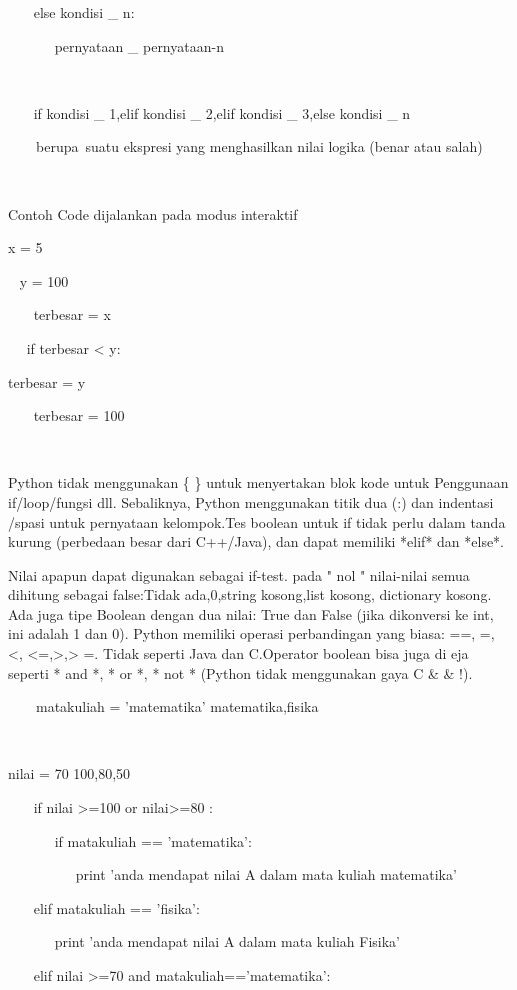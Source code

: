  
~~~ else kondisi   \_  n: 

 
~~~~~~ pernyataan   \_  pernyataan-n 

 
~~~~~~  
 
~~~ if kondisi   \_  1,elif kondisi   \_  2,elif kondisi   \_  3,else kondisi   \_  n 

 
~~~~berupa~suatu ekspresi yang menghasilkan nilai logika (benar atau salah)    
 
~~~  
 
Contoh Code dijalankan pada modus interaktif 

 
  x = 5 

 
~ y = 100 

 
~~~ terbesar = x 

 
~~ if terbesar < y: 

 
terbesar = y 

~~~ terbesar = 100  

 
~~~  

 
   Python tidak menggunakan    \{     \}   untuk menyertakan blok kode untuk Penggunaan if/loop/fungsi dll. Sebaliknya, Python menggunakan titik dua (:) dan indentasi /spasi untuk pernyataan   kelompok.Tes   boolean untuk if tidak perlu dalam tanda kurung (perbedaan besar dari C++/Java), dan dapat memiliki *elif* dan *else*. 
 

            Nilai apapun dapat digunakan sebagai if-test. pada   " nol  "  nilai-nilai semua dihitung sebagai false:Tidak ada,0,string kosong,list kosong, dictionary kosong. Ada juga tipe Boolean dengan dua nilai: True dan False (jika dikonversi ke int, ini adalah 1 dan 0). Python memiliki operasi perbandingan yang biasa: ==, =, <, <=,>,> =. Tidak seperti Java dan C.Operator boolean bisa juga di eja seperti * and *, * or *, * not * (Python tidak menggunakan gaya C    \&      \&      \vert      \vert  !). 

 
~~~~matakuliah = 'matematika'   matematika,fisika 
 
~~  
 
 nilai = 70 100,80,50 

 
~~~ if nilai >=100 or nilai>=80 : 

 
~~~~~~ if matakuliah == 'matematika': 

 
~~~~~~~~~ print 'anda mendapat nilai A dalam mata kuliah matematika' 

 
~~~ elif matakuliah == 'fisika': 

 
~~~~~~ print 'anda mendapat nilai A dalam mata kuliah Fisika' 

 
~~~ elif nilai >=70 and matakuliah=='matematika': 


